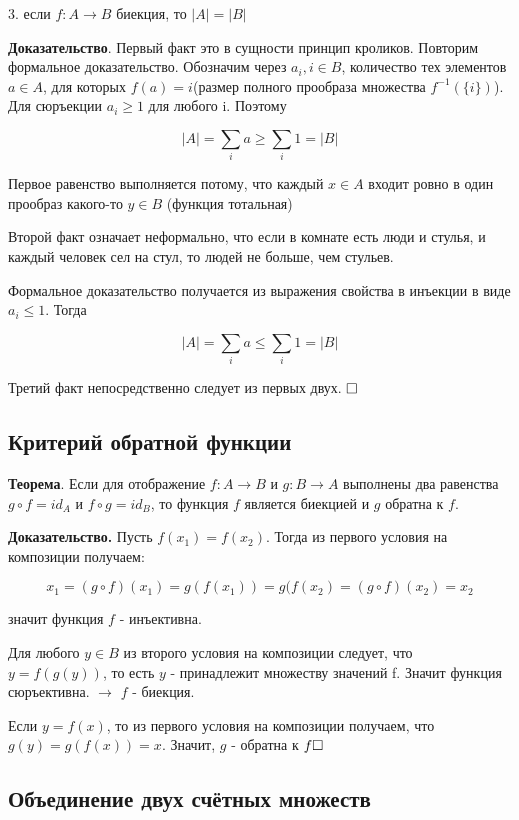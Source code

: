 \documentclass[a4paper, 10pt]{article}
\begin{document}
3. если $f: A \to B$ биекция, то $|A| = |B|$

\medspace


\textbf{Доказательство}. Первый факт это в сущности принцип кроликов. Повторим формальное доказательство. Обозначим через $a_i, i \in B$, количество тех элементов $a \in A$, для которых $f(a) = i$(размер полного прообраза множества $f^{-1}(\{i\})$). Для сюръекции $a_i \geqslant 1$ для любого i. Поэтому

$$|A| = \sum_i{a} \geqslant \sum_i{1} = |B|$$

Первое равенство выполняется потому, что каждый $x \in A$ входит ровно в один прообраз какого-то $y \in B$ (функция тотальная)

Второй факт означает неформально, что если в комнате есть люди и стулья, и каждый человек сел на стул, то людей не больше, чем стульев.

Формальное доказательство получается из выражения свойства в инъекции в виде $a_i \leqslant 1$. Тогда

$$|A| = \sum_i{a} \leqslant \sum_i{1} = |B|$$

Третий факт непосредственно следует из первых двух. $\hfill \square$


\subsection{Критерий обратной функции}

\textbf{Теорема}. Если для отображение $f: A \to B$ и $g: B \to A$ выполнены два равенства $g \circ f = id_A$ и $f \circ g = id_B$, то функция $f$ является биекцией и $g$ обратна к $f$.

\textbf{Доказательство.} Пусть $f(x_1) = f(x_2)$. Тогда из первого условия на композиции получаем:

$$x_1 =(g \circ f)(x_1) = g(f(x_1)) = g(f(x_2) = (g  \circ f)(x_2) = x_2$$

значит функция $f$ - инъективна.

Для любого $y \in B$ из второго условия на композиции следует, что $y = f(g(y))$, то есть $y$ - принадлежит множеству значений f. Значит функция сюръективна. $\longrightarrow$ $f$ - биекция.

Если $y = f(x)$, то из первого условия на композиции получаем, что $g(y) = g(f(x)) = x$. Значит, $g$ - обратна к $f \hfill \square$ 



\subsection{Объединение двух счётных множеств}
\end{document}
